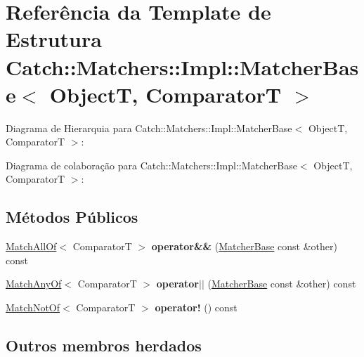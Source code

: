\hypertarget{structCatch_1_1Matchers_1_1Impl_1_1MatcherBase}{}\section{Referência da Template de Estrutura Catch\+:\+:Matchers\+:\+:Impl\+:\+:Matcher\+Base$<$ ObjectT, ComparatorT $>$}
\label{structCatch_1_1Matchers_1_1Impl_1_1MatcherBase}


Diagrama de Hierarquia para Catch\+:\+:Matchers\+:\+:Impl\+:\+:Matcher\+Base$<$ ObjectT, ComparatorT $>$\+:


Diagrama de colaboração para Catch\+:\+:Matchers\+:\+:Impl\+:\+:Matcher\+Base$<$ ObjectT, ComparatorT $>$\+:
\subsection*{Métodos Públicos}
\begin{DoxyCompactItemize}
\item 
\hyperlink{structCatch_1_1Matchers_1_1Impl_1_1MatchAllOf}{Match\+All\+Of}$<$ ComparatorT $>$ {\bfseries operator\&\&} (\hyperlink{structCatch_1_1Matchers_1_1Impl_1_1MatcherBase}{Matcher\+Base} const \&other) const \hypertarget{structCatch_1_1Matchers_1_1Impl_1_1MatcherBase_a0a81a1cf1955daf438fba5607e036e56}{}\label{structCatch_1_1Matchers_1_1Impl_1_1MatcherBase_a0a81a1cf1955daf438fba5607e036e56}

\item 
\hyperlink{structCatch_1_1Matchers_1_1Impl_1_1MatchAnyOf}{Match\+Any\+Of}$<$ ComparatorT $>$ {\bfseries operator$\vert$$\vert$} (\hyperlink{structCatch_1_1Matchers_1_1Impl_1_1MatcherBase}{Matcher\+Base} const \&other) const \hypertarget{structCatch_1_1Matchers_1_1Impl_1_1MatcherBase_a5241c16329b71ce181c3f3fd599d6e06}{}\label{structCatch_1_1Matchers_1_1Impl_1_1MatcherBase_a5241c16329b71ce181c3f3fd599d6e06}

\item 
\hyperlink{structCatch_1_1Matchers_1_1Impl_1_1MatchNotOf}{Match\+Not\+Of}$<$ ComparatorT $>$ {\bfseries operator!} () const \hypertarget{structCatch_1_1Matchers_1_1Impl_1_1MatcherBase_a1c40d784bc484b968bdda10b076709c2}{}\label{structCatch_1_1Matchers_1_1Impl_1_1MatcherBase_a1c40d784bc484b968bdda10b076709c2}

\end{DoxyCompactItemize}
\subsection*{Outros membros herdados}


